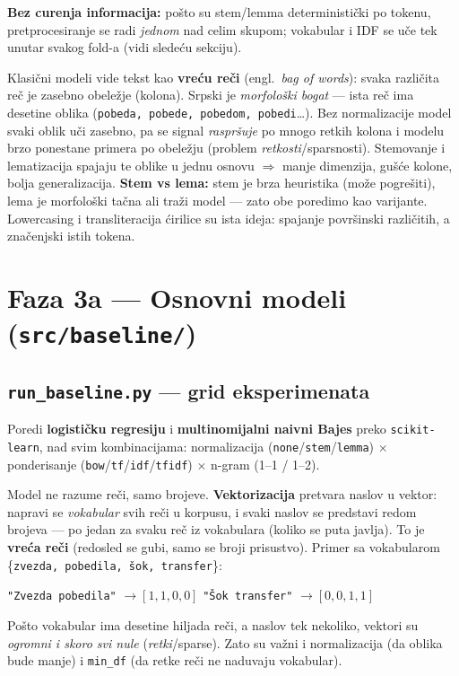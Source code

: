 \documentclass[11pt,a4paper]{article}
\newcommand{\kod}[1]{\texttt{#1}}
\begin{document}
\textbf{Bez curenja informacija:} pošto su stem/lemma deterministički po tokenu,
pretprocesiranje se radi \emph{jednom} nad celim skupom; vokabular i IDF se uče tek
unutar svakog fold-a (vidi sledeću sekciju).

\begin{teorija}
Klasični modeli vide tekst kao \textbf{vreću reči} (engl.\ \emph{bag of words}): svaka
različita reč je zasebno obeležje (kolona). Srpski je \emph{morfološki bogat} --- ista
reč ima desetine oblika (\kod{pobeda, pobede, pobedom, pobedi}\dots). Bez normalizacije
model svaki oblik uči zasebno, pa se signal \emph{raspršuje} po mnogo retkih kolona i
modelu brzo ponestane primera po obeležju (problem \emph{retkosti}/sparsnosti).
Stemovanje i lematizacija spajaju te oblike u jednu osnovu $\Rightarrow$ manje
dimenzija, gušće kolone, bolja generalizacija. \textbf{Stem vs lema:} stem je brza
heuristika (može pogrešiti), lema je morfološki tačna ali traži model --- zato obe
poredimo kao varijante. Lowercasing i transliteracija ćirilice su ista ideja:
spajanje površinski različitih, a značenjski istih tokena.
\end{teorija}

\section{Faza 3a --- Osnovni modeli (\texttt{src/baseline/})}

\subsection{\texttt{run\_baseline.py} --- grid eksperimenata}
Poredi \textbf{logističku regresiju} i \textbf{multinomijalni naivni Bajes} preko
\kod{scikit-learn}, nad svim kombinacijama: normalizacija
(\kod{none}/\kod{stem}/\kod{lemma}) $\times$ ponderisanje
(\kod{bow}/\kod{tf}/\kod{idf}/\kod{tfidf}) $\times$ n-gram (1--1 / 1--2).

\begin{teorija}
Model ne razume reči, samo brojeve. \textbf{Vektorizacija} pretvara naslov u vektor:
napravi se \emph{vokabular} svih reči u korpusu, i svaki naslov se predstavi redom
brojeva --- po jedan za svaku reč iz vokabulara (koliko se puta javlja). To je
\textbf{vreća reči} (redosled se gubi, samo se broji prisustvo). Primer sa vokabularom
\{\kod{zvezda, pobedila, šok, transfer}\}:
\begin{center}\small
\kod{"Zvezda pobedila"} $\to [1,1,0,0]$ \quad\quad
\kod{"Šok transfer"} $\to [0,0,1,1]$
\end{center}
Pošto vokabular ima desetine hiljada reči, a naslov tek nekoliko, vektori su
\emph{ogromni i skoro svi nule} (\emph{retki}/sparse). Zato su važni i normalizacija
(da oblika bude manje) i \kod{min\_df} (da retke reči ne naduvaju vokabular).
\end{teorija}
\end{document}
